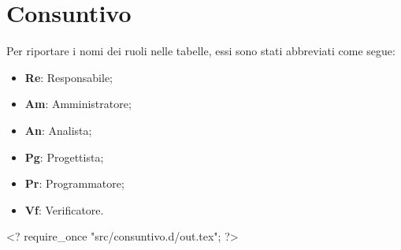 \nonstopmode
\pagebreak

\section{Consuntivo}

Per riportare i nomi dei ruoli nelle tabelle, essi sono stati abbreviati come segue:

\begin{itemize}
\item \textbf{Re}: Responsabile;
\item \textbf{Am}: Amministratore;
\item \textbf{An}: Analista;
\item \textbf{Pg}: Progettista;
\item \textbf{Pr}: Programmatore;
\item \textbf{Vf}: Verificatore.
\end{itemize}

<? require_once "src/consuntivo.d/out.tex"; ?>
